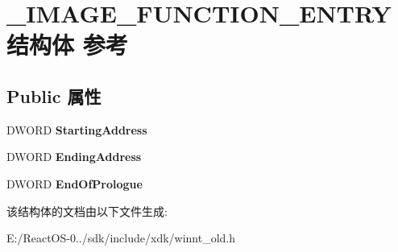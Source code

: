 \hypertarget{struct___i_m_a_g_e___f_u_n_c_t_i_o_n___e_n_t_r_y}{}\section{\+\_\+\+I\+M\+A\+G\+E\+\_\+\+F\+U\+N\+C\+T\+I\+O\+N\+\_\+\+E\+N\+T\+R\+Y结构体 参考}
\label{struct___i_m_a_g_e___f_u_n_c_t_i_o_n___e_n_t_r_y}
\subsection*{Public 属性}
\begin{DoxyCompactItemize}
\item 
\mbox{\label{struct___i_m_a_g_e___f_u_n_c_t_i_o_n___e_n_t_r_y_a133f3138b09137069eab66fe2402a13c}} 
D\+W\+O\+RD {\bfseries Starting\+Address}
\item 
\mbox{\label{struct___i_m_a_g_e___f_u_n_c_t_i_o_n___e_n_t_r_y_ab2d854db38943d135cef8f64a9092004}} 
D\+W\+O\+RD {\bfseries Ending\+Address}
\item 
\mbox{\label{struct___i_m_a_g_e___f_u_n_c_t_i_o_n___e_n_t_r_y_af11ba868a318a99e1a1db8fbec927841}} 
D\+W\+O\+RD {\bfseries End\+Of\+Prologue}
\end{DoxyCompactItemize}


该结构体的文档由以下文件生成\+:\begin{DoxyCompactItemize}
\item 
E\+:/\+React\+O\+S-\/0../sdk/include/xdk/winnt\+\_\+old.\+h\end{DoxyCompactItemize}
